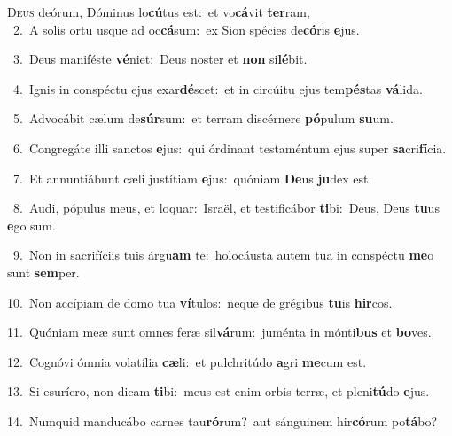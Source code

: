 \lettrine{\initial\textcolor{\initialcolor}{D}}{eus} deórum, Dóminus lo\-\textbf{cú}\-tus est:~\star et vo\-\textbf{cá}\-vit \textbf{ter}\-ram,\\
{\numbfont\textcolor{\numbcolor}{~2.}}~A solis ortu usque ad oc\-\textbf{cá}\-sum:~\star ex Sion spécies de\-\textbf{có}\-ris \textbf{e}\-jus.\par
{\numbfont\textcolor{\numbcolor}{~3.}}~Deus maniféste \textbf{vé}\-niet:~\star Deus noster et \textbf{non} si\-\textbf{lé}\-bit.\par
{\numbfont\textcolor{\numbcolor}{~4.}}~Ignis in conspéctu ejus exar\-\textbf{dé}\-scet:~\star et in circúitu ejus tem\-\textbf{pés}\-tas \textbf{vá}\-lida.\par
{\numbfont\textcolor{\numbcolor}{~5.}}~Advocábit cælum de\-\textbf{súr}\-sum:~\star et terram discérnere \textbf{pó}\-pulum \textbf{su}\-um.\par
{\numbfont\textcolor{\numbcolor}{~6.}}~Congregáte illi sanctos \textbf{e}\-jus:~\star qui órdinant testaméntum ejus super \textbf{sa}\-cri\-\textbf{fí}\-cia.\par
{\numbfont\textcolor{\numbcolor}{~7.}}~Et annuntiábunt cæli justítiam \textbf{e}\-jus:~\star quóniam \textbf{De}\-us \textbf{ju}\-dex est.\par
{\numbfont\textcolor{\numbcolor}{~8.}}~Audi, pópulus meus, et loquar:~\dagger Israël, et testificábor \textbf{ti}\-bi:~\star Deus, Deus \textbf{tu}\-us \textbf{e}\-go sum.\par
{\numbfont\textcolor{\numbcolor}{~9.}}~Non in sacrifíciis tuis árgu\textbf{am} te:~\star holocáusta autem tua in conspéctu \textbf{me}\-o sunt \textbf{sem}\-per.\par
{\numbfont\textcolor{\numbcolor}{10.}}~Non accípiam de domo tua \textbf{ví}\-tulos:~\star neque de grégibus \textbf{tu}\-is \textbf{hir}\-cos.\par
{\numbfont\textcolor{\numbcolor}{11.}}~Quóniam meæ sunt omnes feræ sil\-\textbf{vá}\-rum:~\star juménta in mónti\textbf{bus} et \textbf{bo}\-ves.\par
{\numbfont\textcolor{\numbcolor}{12.}}~Cognóvi ómnia volatília \textbf{cæ}\-li:~\star et pulchritúdo \textbf{a}\-gri \textbf{me}\-cum est.\par
{\numbfont\textcolor{\numbcolor}{13.}}~Si esuríero, non dicam \textbf{ti}\-bi:~\star meus est enim orbis terræ, et pleni\-\textbf{tú}\-do \textbf{e}\-jus.\par
{\numbfont\textcolor{\numbcolor}{14.}}~Numquid manducábo carnes tau\-\textbf{ró}\-rum?~\star aut sánguinem hir\-\textbf{có}\-rum po\-\textbf{tá}\-bo?\par
